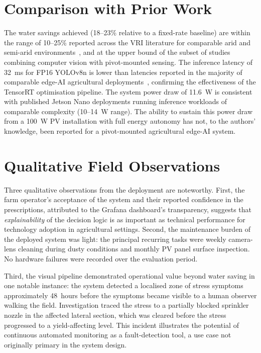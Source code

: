 \documentclass[12pt,a4paper]{report}
\begin{document}
\section{Comparison with Prior Work}

The water savings achieved (18--23\% relative to a fixed-rate baseline) are within the range of 10--25\% reported across the VRI literature for comparable arid and semi-arid environments~\cite{Evans2012}, and at the upper bound of the subset of studies combining computer vision with pivot-mounted sensing. The inference latency of 32~ms for FP16 YOLOv8n is lower than latencies reported in the majority of comparable edge-AI agricultural deployments~\cite{Torres2022}, confirming the effectiveness of the TensorRT optimisation pipeline. The system power draw of 11.6~W is consistent with published Jetson Nano deployments running inference workloads of comparable complexity (10--14~W range). The ability to sustain this power draw from a 100~W PV installation with full energy autonomy has not, to the authors' knowledge, been reported for a pivot-mounted agricultural edge-AI system.

\section{Qualitative Field Observations}

Three qualitative observations from the deployment are noteworthy. First, the farm operator's acceptance of the system and their reported confidence in the prescriptions, attributed to the Grafana dashboard's transparency, suggests that \emph{explainability} of the decision logic is as important as technical performance for technology adoption in agricultural settings. Second, the maintenance burden of the deployed system was light: the principal recurring tasks were weekly camera-lens cleaning during dusty conditions and monthly PV panel surface inspection. No hardware failures were recorded over the evaluation period.

Third, the visual pipeline demonstrated operational value beyond water saving in one notable instance: the system detected a localised zone of stress symptoms approximately 48~hours before the symptoms became visible to a human observer walking the field. Investigation traced the stress to a partially blocked sprinkler nozzle in the affected lateral section, which was cleared before the stress progressed to a yield-affecting level. This incident illustrates the potential of continuous automated monitoring as a fault-detection tool, a use case not originally primary in the system design.
\end{document}
